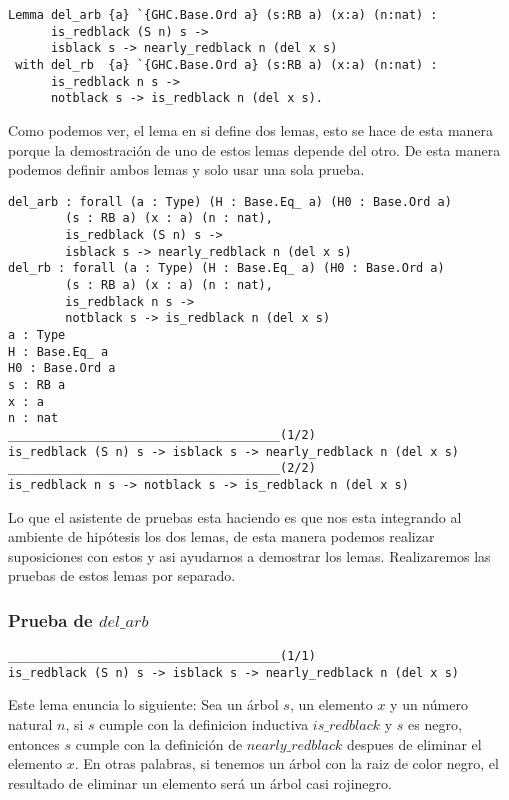 \begin{verbatim}
Lemma del_arb {a} `{GHC.Base.Ord a} (s:RB a) (x:a) (n:nat) :
      is_redblack (S n) s ->
      isblack s -> nearly_redblack n (del x s)
 with del_rb  {a} `{GHC.Base.Ord a} (s:RB a) (x:a) (n:nat) :
      is_redblack n s ->
      notblack s -> is_redblack n (del x s).
\end{verbatim}

Como podemos ver, el lema en si define dos lemas, esto se hace de esta manera porque la
demostraci\'on de uno de estos lemas depende del otro. De esta manera podemos definir ambos lemas y
solo usar una sola prueba.

\begin{verbatim}
del_arb : forall (a : Type) (H : Base.Eq_ a) (H0 : Base.Ord a)
        (s : RB a) (x : a) (n : nat),
        is_redblack (S n) s ->
        isblack s -> nearly_redblack n (del x s)
del_rb : forall (a : Type) (H : Base.Eq_ a) (H0 : Base.Ord a)
        (s : RB a) (x : a) (n : nat),
        is_redblack n s ->
        notblack s -> is_redblack n (del x s)
a : Type
H : Base.Eq_ a
H0 : Base.Ord a
s : RB a
x : a
n : nat
______________________________________(1/2)
is_redblack (S n) s -> isblack s -> nearly_redblack n (del x s)
______________________________________(2/2)
is_redblack n s -> notblack s -> is_redblack n (del x s)
\end{verbatim}

Lo que el asistente de pruebas esta haciendo es que nos esta integrando al ambiente de hip\'otesis
los dos lemas, de esta manera podemos realizar suposiciones con estos y asi ayudarnos a demostrar
los lemas. Realizaremos las pruebas de estos lemas por separado.

\subsubsection{Prueba de $del\_arb$}

\begin{verbatim}
______________________________________(1/1)
is_redblack (S n) s -> isblack s -> nearly_redblack n (del x s)
\end{verbatim}

Este lema enuncia lo siguiente: Sea un \'arbol $s$, un elemento $x$ y un n\'umero natural $n$, si
$s$ cumple con la definicion inductiva $is\_redblack$ y $s$ es negro, entonces $s$ cumple con la
definición de $nearly\_redblack$ despues de eliminar el elemento $x$. En otras palabras, si tenemos
un \'arbol con la raiz de color negro, el resultado de eliminar un elemento ser\'a un \'arbol casi
 rojinegro.

